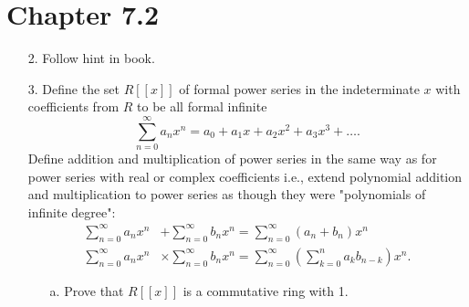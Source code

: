 \documentclass[10pt]{article}
\begin{document}
\section*{Chapter 7.2}

\begin{itemize}


\item[2.]  Follow hint in book.  

\item[3.] Define the set $R[[x]]$ of formal power series in the indeterminate $x$ with coefficients from $R$ to be all formal infinite $$\sum_{n=0}^\infty a_nx^n = a_0+a_1x+a_2x^2+a_3x^3+\ldots.$$
    Define addition and multiplication of power series in the same way as for power series with real or complex coefficients i.e., extend polynomial addition and multiplication to power series as though they were "polynomials of infinite degree":
\begin{align*}
\sum_{n=0}^\infty a_nx^n &+\sum_{n=0}^\infty b_nx^n  = \sum_{n=0}^\infty (a_n+b_n)x^n\\
\sum_{n=0}^\infty a_nx^n & \times\sum_{n=0}^\infty b_nx^n  = \sum_{n=0}^\infty\left(\sum_{k=0}^n a_kb_{n-k}\right)x^n.
\end{align*}

\begin{itemize}

\item[a.] Prove that $R[[x]]$ is a commutative ring with 1.


\end{itemize}
\end{itemize}
\end{document}
